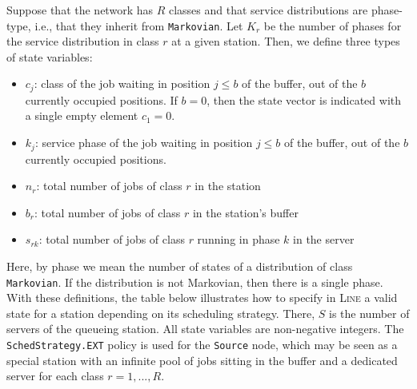 Suppose that the network has $R$ classes and that service distributions are phase-type, i.e., that they inherit from \texttt{Markovian}. Let $K_{r}$ be the number of phases for the service distribution in class $r$ at a given station. Then, we define three types of state variables:
\begin{itemize}
\item $c_j$: class of the job waiting in position $j\leq b$ of the buffer, out of the $b$ currently occupied positions. If $b=0$, then the state vector is indicated with a single empty element $c_1=0$.
\item $k_j$: service phase of the job waiting in position $j\leq b$ of the buffer, out of the $b$ currently occupied positions.
\item $n_r$: total number of jobs of class $r$ in the station
\item $b_r$: total number of jobs of class $r$ in the station's buffer
\item $s_{rk}$: total number of jobs of class $r$ running in phase $k$ in the server
\end{itemize}
Here, by phase we mean the number of states of a distribution of class \texttt{Markovian}. If the distribution is not Markovian, then there is a  single phase.
With these definitions, the table below illustrates how to specify in \textsc{Line} a valid state for a station depending on its scheduling strategy. There, $S$ is the number of servers of the queueing station. All state variables are non-negative integers. The \texttt{SchedStrategy.EXT} policy is used for the \texttt{Source} node, which may be seen as a special station with an infinite pool of jobs sitting in the buffer and a dedicated server for each class $r=1,...,R$.
